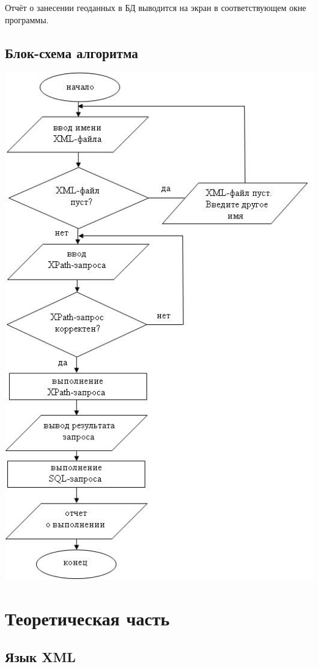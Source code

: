 \documentclass[12pt,a4paper,oneside]{article} %
\begin{document}
Отчёт о занесении геоданных в БД выводится на экран в соответствующем окне программы.

\newpage
\subsection{Блок-схема алгоритма}

\includegraphics[width=0.9\linewidth]{box}

\newpage
\section{Теоретическая часть}

\subsection{Язык XML}
\end{document}

